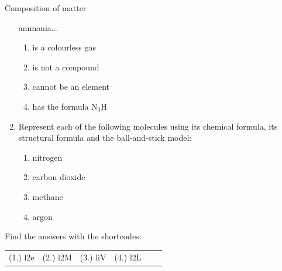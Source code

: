 \begin{eocexercises}{Composition of matter}
\begin{enumerate}[noitemsep, label=\textbf{\arabic*}. ]
ammonia...
\label{m38120*id311590}\begin{enumerate}[noitemsep, label=\textbf{\alph*}. ] 
            \label{m38120*uid94}\item is a 
colourless gas
\label{m38120*uid95}\item is not a compound
\label{m38120*uid96}\item cannot be an element
\label{m38120*uid97}\item has the formula ${\mathrm{N}}_{3}\mathrm{H}$
\end{enumerate}
        \item Represent each of the following molecules using its chemical formula, its structural formula and the ball-and-stick model:
\label{m38120*id524}\begin{enumerate}[noitemsep, label=\textbf{\alph*}. ] 
            \item nitrogen\item carbon dioxide\item methane\item argon\end{enumerate}
\end{enumerate}
  \label{m38120**end}
\par {} Find the answers with the shortcodes:
 \par \begin{tabular}[h]{cccccc}
 (1.) l2e  &  (2.) l2M  &  (3.) liV  &  (4.) l2L  & \end{tabular}
\end{eocexercises}
